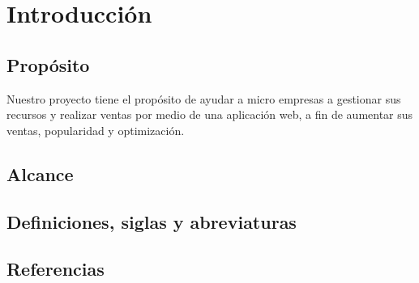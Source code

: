 \chapter{Introducción}

\section{Propósito}

Nuestro proyecto tiene el propósito de ayudar a micro empresas a gestionar sus recursos y realizar ventas por medio de una aplicación web, a fin de aumentar sus ventas, popularidad y optimización.

\section{Alcance}

\section{Definiciones, siglas y abreviaturas}

\section{Referencias}